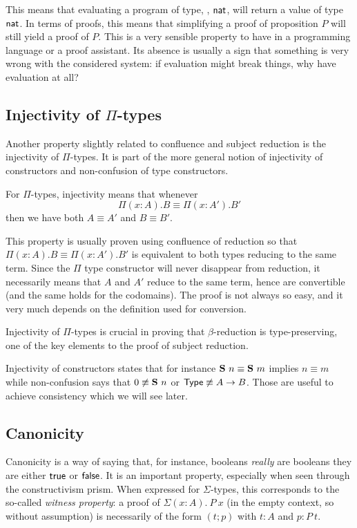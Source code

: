 This means that evaluating a program of type, \eg, \(\mathsf{nat}\), will return a
value of type \(\mathsf{nat}\). In terms of proofs, this means that simplifying a proof
of proposition \(P\) will still yield a proof of \(P\). This is a very
sensible property to have in a programming language or a proof assistant.
Its absence is usually a sign that something is very wrong with the considered
system: if evaluation might break things, why have evaluation at all?

\subsection{Injectivity of \(\Pi\)-types}

Another property slightly related to confluence and subject reduction is
the injectivity of \(\Pi\)-types. It is part of the more general notion of
injectivity of constructors and non-confusion of type constructors.

For \(\Pi\)-types, injectivity means that whenever
\[
  \Pi (x:A).B \equiv \Pi (x:A').B'
\]
then we have both \(A \equiv A'\) and \(B \equiv B'\).

This property is usually proven using confluence of reduction so that
\(\Pi (x:A).B \equiv \Pi (x:A').B'\) is equivalent to both types
reducing to the same term. Since the \(\Pi\) type constructor will never
disappear from reduction, it necessarily means that \(A\) and \(A'\) reduce to
the same term, hence are convertible (and the same holds for the codomains).
The proof is not always so easy, and it very much depends on the definition
used for conversion.

Injectivity of \(\Pi\)-types is crucial in proving that \(\beta\)-reduction is
type-preserving, one of the key elements to the proof of subject reduction.

Injectivity of constructors states that for instance
\(\mathbf{S}\ n \equiv \mathbf{S}\ m\) implies \(n \equiv m\) while non-confusion
says that \(0 \not\equiv \mathbf{S}\ n\) or \(\mathsf{Type} \not\equiv A \to B\).
Those are useful to achieve consistency which we will see later.

\subsection{Canonicity}

Canonicity is a way of saying that, for instance, booleans \emph{really} are
booleans \ie they are either \(\mathsf{true}\) or \(\mathsf{false}\).
It is an important property, especially when seen through the constructivism
prism.
When expressed for \(\Sigma\)-types, this corresponds to the so-called
\emph{witness property}: a proof of \(\Sigma (x:A).\ P\ x\) (in the empty
context, so without assumption) is necessarily of the form \((t;p)\)
with \(t : A\) and \(p : P\ t\).

